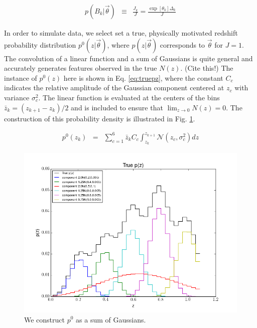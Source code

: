 \documentclass[12pt, onecolumn]{emulateapj}
\begin{document}
\begin{eqnarray}
\label{eq:dparams}
p(B_{k}|\vec{\theta}) &\equiv& \frac{J_{k}}{J} = \frac{\exp[\theta_{k}]\Delta_{k}}{J}
\end{eqnarray}

In order to simulate data, we select set a true, physically motivated redshift probability distribution $p^{0}(z|\vec{\theta})$, where $p(z|\vec{\theta})$ corresponds to $\vec{\theta}$ for $J=1$.  The convolution of a linear function and a sum of Gaussians is quite general and accurately generates features observed in the true $N(z)$.  (Cite this!)  The instance of $p^{0}(z)$ here is shown in Eq. \ref{eq:truepz}, where the constant $C_{c}$ indicates the relative amplitude of the Gaussian component centered at $z_{c}$ with variance $\sigma_{c}^{2}$.  The linear function is evaluated at the centers of the bins $\bar{z}_{k}=(z_{k+1}-z_{k})/2$ and is included to ensure that $\lim_{z\to0}N(z)=0$.  The construction of this probability density is illustrated in Fig. \ref{fig:truepz}.  

\begin{eqnarray}
\label{eq:truepz}
p^{0}(z_{k}) &=& \sum_{c=1}^{6}\bar{z}_{k}C_{c}\int_{z_{k}}^{z_{k+1}} \mathcal{N}(z_{c},\sigma^{2}_{c})dz
\end{eqnarray}

\begin{figure}
\label{fig:truepz}
\includegraphics[scale=0.5]{truePz.png}
\caption{We construct $p^{0}$ as a sum of Gaussians.}
\end{figure}
\end{document}
